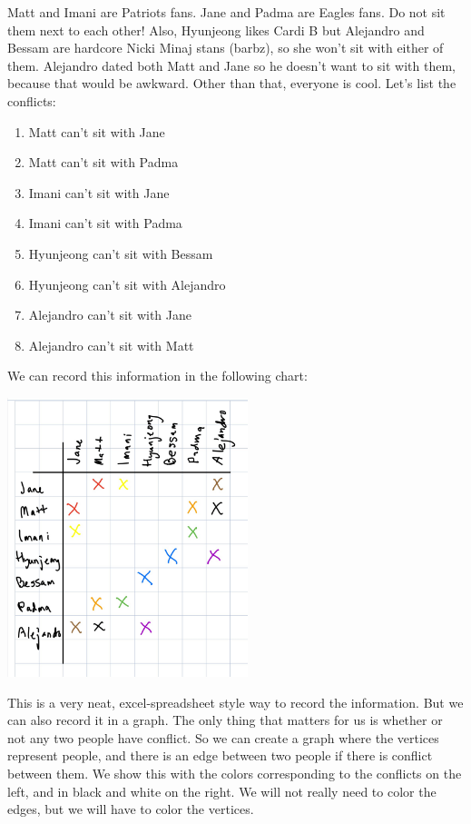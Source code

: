 Matt and Imani are Patriots fans. Jane and Padma are Eagles fans. 
Do not sit them next to each other! Also, Hyunjeong likes Cardi B but Alejandro and Bessam are hardcore Nicki Minaj stans (barbz), so she won't sit with either of them. Alejandro dated both Matt and Jane so he doesn't want to sit with them, because that would be awkward. Other than that, everyone is cool. Let's list the conflicts:
\begin{enumerate}
    \item Matt can't sit with Jane
    \item Matt can't sit with Padma
    \item Imani can't sit with Jane
    \item Imani can't sit with Padma
    \item Hyunjeong can't sit with Bessam
    \item Hyunjeong can't sit with Alejandro
    \item Alejandro can't sit with Jane
    \item Alejandro can't sit with Matt
\end{enumerate}

We can record this information in the following chart:
\begin{center}
\includegraphics[width=7cm]{pics/dislike-chart.jpeg}
\end{center}

This is a very neat, excel-spreadsheet style way to record the information. But we can also record it in a graph. The only thing that matters for us is whether or not any two people have conflict. So we can create a graph where the vertices represent people, and there is an edge between two people if there is conflict between them.
We show this with the colors corresponding to the conflicts on the left, and in black and white on the right. We will not really need to color the edges, but we will have to color the vertices.

